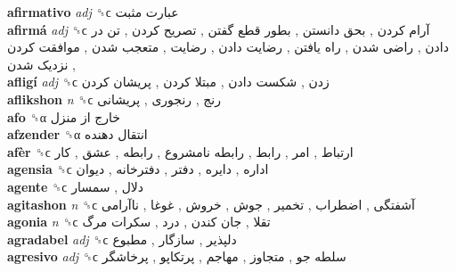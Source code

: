 \textbf{afirmativo} \emph{adj}  ␝ϲ   عبارت مثبت   \\
\textbf{afirmá} \emph{adj}  ␝ϲ   آرام کردن ,  بحق دانستن ,  بطور قطع گفتن ,  تصریح کردن ,  تن در دادن ,  راضی شدن ,  راه یافتن ,  رضایت دادن ,  رضایت ,  متعجب شدن ,  موافقت کردن ,  نزدیک شدن   \\
\textbf{afligí} \emph{adj}  ␝ϲ   زدن ,  شکست دادن ,  مبتلا کردن ,  پریشان کردن   \\
\textbf{aflikshon} \emph{n}  ␝ϲ   رنج ,  رنجوری ,  پریشانی   \\
\textbf{afo} ␝α   خارج از منزل   \\
\textbf{afzender} ␝α   انتقال دهنده   \\
\textbf{afèr} ␝ϲ   ارتباط ,  امر ,  رابط ,  رابطه نامشروع ,  رابطه ,  عشق ,  کار   \\
\textbf{agensia} ␝ϲ   اداره ,  دایره ,  دفتر ,  دفترخانه ,  دیوان   \\
\textbf{agente} ␝ϲ   دلال ,  سمسار   \\
\textbf{agitashon} \emph{n}  ␝ϲ   آشفتگی ,  اضطراب ,  تخمیر ,  جوش ,  خروش ,  غوغا ,  ناآرامی   \\
\textbf{agonia} \emph{n}  ␝ϲ   تقلا ,  جان کندن ,  درد ,  سکرات مرگ   \\
\textbf{agradabel} \emph{adj}  ␝ϲ   دلپذیر ,  سازگار ,  مطبوع   \\
\textbf{agresivo} \emph{adj}  ␝ϲ   سلطه جو ,  متجاوز ,  مهاجم ,  پرتکاپو ,  پرخاشگر   \\
